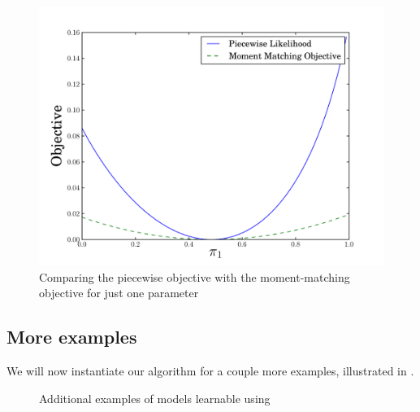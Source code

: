 \begin{figure}
  \centering
  \includegraphics[width=\columnwidth]{figures/piecewise-objective.pdf}
  \caption{Comparing the piecewise objective with the moment-matching objective for just one parameter}
  \label{fig:piecewise-objective}
\end{figure}

\subsection{More examples}

We will now instantiate our algorithm for a couple more examples, illustrated in .

\begin{figure}
  \centering
  \caption{Additional examples of models learnable using \LearnMarginals}
  \label{fig:examples}
\end{figure}

